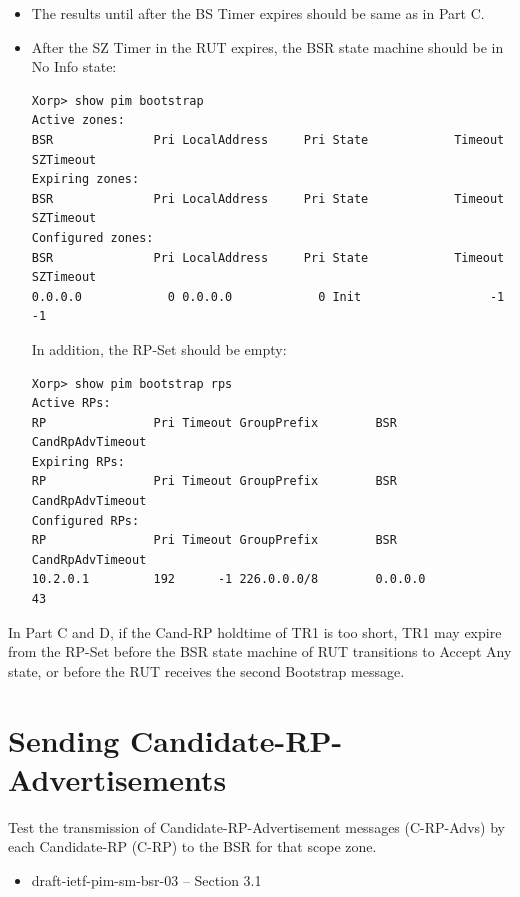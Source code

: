 \documentclass[11pt]{report}
\begin{document}
\begin{itemize}

  \item The results until after the BS Timer expires should be same as in Part
  C.

  \item After the SZ Timer in the RUT expires, the BSR state machine should be
  in No Info state:

\begin{verbatim}
Xorp> show pim bootstrap 
Active zones:
BSR              Pri LocalAddress     Pri State            Timeout SZTimeout
Expiring zones:
BSR              Pri LocalAddress     Pri State            Timeout SZTimeout
Configured zones:
BSR              Pri LocalAddress     Pri State            Timeout SZTimeout
0.0.0.0            0 0.0.0.0            0 Init                  -1        -1
\end{verbatim}

  In addition, the RP-Set should be empty:

\begin{verbatim}
Xorp> show pim bootstrap rps 
Active RPs:
RP               Pri Timeout GroupPrefix        BSR         CandRpAdvTimeout
Expiring RPs:
RP               Pri Timeout GroupPrefix        BSR         CandRpAdvTimeout
Configured RPs:
RP               Pri Timeout GroupPrefix        BSR         CandRpAdvTimeout
10.2.0.1         192      -1 226.0.0.0/8        0.0.0.0                   43
\end{verbatim}

\end{itemize}


In Part C and D, if the Cand-RP holdtime of TR1 is too short, TR1 may expire
from the RP-Set before the BSR state machine of RUT transitions to Accept Any
state, or before the RUT receives the second Bootstrap message.


\newpage
\section{Sending Candidate-RP-Advertisements}

Test the transmission of Candidate-RP-Advertisement messages (C-RP-Advs)
by each Candidate-RP (C-RP) to the BSR for that scope zone.


\begin{itemize}
  \item draft-ietf-pim-sm-bsr-03 -- Section 3.1
\end{itemize}
\end{document}
